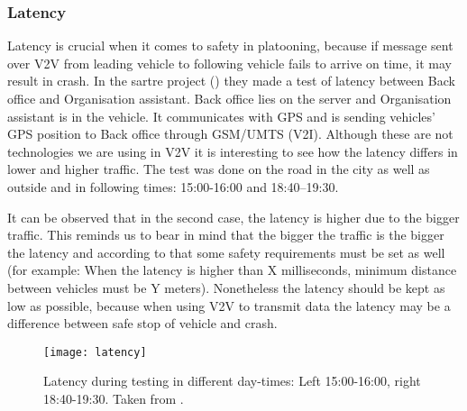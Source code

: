 \subsubsection{Latency}
Latency is crucial when it comes to safety in platooning, because if message sent over V2V from leading vehicle to following vehicle fails to arrive on time, it may result in crash. In the \acrshort{sartre} project (\cite{Chan2012ProjectSARTRE}) they made a test of latency between Back office and Organisation assistant. Back office lies on the server and Organisation assistant is in the vehicle. It communicates with \acrshort{GPS} and is sending vehicles’ \acrshort{GPS} position to Back office through GSM/UMTS (\acrshort{V2I}). Although these are not technologies we are using in V2V it is interesting to see how the latency differs in lower and higher traffic. The test was done on the road in the city as well as outside and in following times: 15:00-16:00 and 18:40–19:30.\par
% 
It can be observed that in the second case, the latency is higher due to the bigger traffic. This reminds us to bear in mind that the bigger the traffic is the bigger the latency and according to that some safety requirements must be set as well (for example: When the latency is higher than X milliseconds, minimum distance between vehicles must be Y meters). Nonetheless the latency should be kept as low as possible, because when using \acrshort{V2V} to transmit data the latency may be a difference between safe stop of vehicle and crash.
% 
\begin{figure}[p]
    \centering
    \texttt{[image: latency]}
    \caption{Latency during testing in different day-times: Left 15:00-16:00, right 18:40-19:30. Taken from \cite[p. 24]{Chan2012ProjectSARTRE}.}
    \label{fig:latency}
\end{figure}
% 